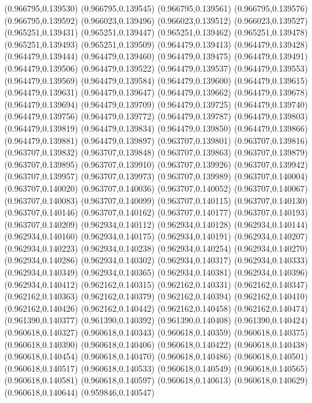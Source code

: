 (0.966795,0.139530)
(0.966795,0.139545)
(0.966795,0.139561)
(0.966795,0.139576)
(0.966795,0.139592)
(0.966023,0.139496)
(0.966023,0.139512)
(0.966023,0.139527)
(0.965251,0.139431)
(0.965251,0.139447)
(0.965251,0.139462)
(0.965251,0.139478)
(0.965251,0.139493)
(0.965251,0.139509)
(0.964479,0.139413)
(0.964479,0.139428)
(0.964479,0.139444)
(0.964479,0.139460)
(0.964479,0.139475)
(0.964479,0.139491)
(0.964479,0.139506)
(0.964479,0.139522)
(0.964479,0.139537)
(0.964479,0.139553)
(0.964479,0.139569)
(0.964479,0.139584)
(0.964479,0.139600)
(0.964479,0.139615)
(0.964479,0.139631)
(0.964479,0.139647)
(0.964479,0.139662)
(0.964479,0.139678)
(0.964479,0.139694)
(0.964479,0.139709)
(0.964479,0.139725)
(0.964479,0.139740)
(0.964479,0.139756)
(0.964479,0.139772)
(0.964479,0.139787)
(0.964479,0.139803)
(0.964479,0.139819)
(0.964479,0.139834)
(0.964479,0.139850)
(0.964479,0.139866)
(0.964479,0.139881)
(0.964479,0.139897)
(0.963707,0.139801)
(0.963707,0.139816)
(0.963707,0.139832)
(0.963707,0.139848)
(0.963707,0.139863)
(0.963707,0.139879)
(0.963707,0.139895)
(0.963707,0.139910)
(0.963707,0.139926)
(0.963707,0.139942)
(0.963707,0.139957)
(0.963707,0.139973)
(0.963707,0.139989)
(0.963707,0.140004)
(0.963707,0.140020)
(0.963707,0.140036)
(0.963707,0.140052)
(0.963707,0.140067)
(0.963707,0.140083)
(0.963707,0.140099)
(0.963707,0.140115)
(0.963707,0.140130)
(0.963707,0.140146)
(0.963707,0.140162)
(0.963707,0.140177)
(0.963707,0.140193)
(0.963707,0.140209)
(0.962934,0.140112)
(0.962934,0.140128)
(0.962934,0.140144)
(0.962934,0.140160)
(0.962934,0.140175)
(0.962934,0.140191)
(0.962934,0.140207)
(0.962934,0.140223)
(0.962934,0.140238)
(0.962934,0.140254)
(0.962934,0.140270)
(0.962934,0.140286)
(0.962934,0.140302)
(0.962934,0.140317)
(0.962934,0.140333)
(0.962934,0.140349)
(0.962934,0.140365)
(0.962934,0.140381)
(0.962934,0.140396)
(0.962934,0.140412)
(0.962162,0.140315)
(0.962162,0.140331)
(0.962162,0.140347)
(0.962162,0.140363)
(0.962162,0.140379)
(0.962162,0.140394)
(0.962162,0.140410)
(0.962162,0.140426)
(0.962162,0.140442)
(0.962162,0.140458)
(0.962162,0.140474)
(0.961390,0.140377)
(0.961390,0.140392)
(0.961390,0.140408)
(0.961390,0.140424)
(0.960618,0.140327)
(0.960618,0.140343)
(0.960618,0.140359)
(0.960618,0.140375)
(0.960618,0.140390)
(0.960618,0.140406)
(0.960618,0.140422)
(0.960618,0.140438)
(0.960618,0.140454)
(0.960618,0.140470)
(0.960618,0.140486)
(0.960618,0.140501)
(0.960618,0.140517)
(0.960618,0.140533)
(0.960618,0.140549)
(0.960618,0.140565)
(0.960618,0.140581)
(0.960618,0.140597)
(0.960618,0.140613)
(0.960618,0.140629)
(0.960618,0.140644)
(0.959846,0.140547)
